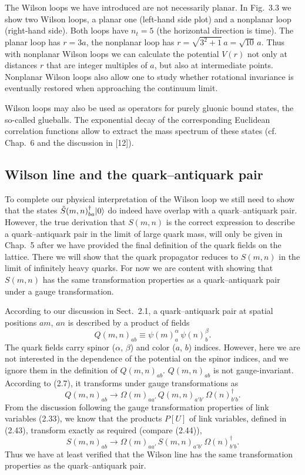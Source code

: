 The Wilson loops we have introduced are not necessarily planar. In Fig.~3.3 we
show two Wilson loops, a planar one (left-hand side plot) and a nonplanar loop
(right-hand side). Both loops have $n_t = 5$ (the horizontal direction is
time). The planar loop has $r = 3a$, the nonplanar loop has
$r = \sqrt{3^2 + 1}\,a = \sqrt{10}\,a$. Thus with nonplanar Wilson loops we can
calculate the potential $V(r)$ not only at distances $r$ that are integer
multiples of $a$, but also at intermediate points. Nonplanar Wilson loops also
allow one to study whether rotational invariance is eventually restored when
approaching the continuum limit.

Wilson loops may also be used as operators for purely gluonic bound states, the
so-called glueballs. The exponential decay of the corresponding Euclidean
correlation functions allow to extract the mass spectrum of these states (cf.
Chap.~6 and the discussion in [12]).

\subsection{Wilson line and the quark--antiquark pair}

To complete our physical interpretation of the Wilson loop we still need to show
that the states $\tilde S(m,n)^\dagger_{ba}|0\rangle$ do indeed have overlap with
a quark--antiquark pair. However, the true derivation that $S(m, n)$ is the
correct expression to describe a quark--antiquark pair in the limit of large
quark mass, will only be given in Chap.~5 after we have provided the final
definition of the quark fields on the lattice. There we will show that the quark
propagator reduces to $S(m, n)$ in the limit of infinitely heavy quarks. For
now we are content with showing that $S(m, n)$ has the same transformation
properties as a quark--antiquark pair under a gauge transformation.

According to our discussion in Sect.~2.1, a quark--antiquark pair at spatial
positions $am$, $an$ is described by a product of fields
\begin{equation}
  Q(m, n)_{ab} \equiv \psi(m)^{\alpha}_{a}\,\psi(n)^{\beta}_{b} .
\end{equation}
The quark fields carry spinor ($\alpha$, $\beta$) and color ($a$, $b$) indices.
However, here we are not interested in the dependence of the potential on the
spinor indices, and we ignore them in the definition of $Q(m, n)_{ab}$.
$Q(m, n)_{ab}$ is not gauge-invariant. According to (2.7), it transforms under
gauge transformations as
\begin{equation}
  Q(m, n)_{ab} \to \Omega(m)_{aa'}\,Q(m, n)_{a'b'}\,\Omega(n)^\dagger_{b'b} .
\end{equation}
From the discussion following the gauge transformation properties of link
variables (2.33), we know that the products $P[U]$ of link variables, defined
in (2.43), transform exactly as required (compare (2.44)),
\begin{equation}
  S(m, n)_{ab} \to \Omega(m)_{aa'}\,S(m, n)_{a'b'}\,\Omega(n)^\dagger_{b'b} .
\end{equation}
Thus we have at least verified that the Wilson line has the same transformation
properties as the quark--antiquark pair.

